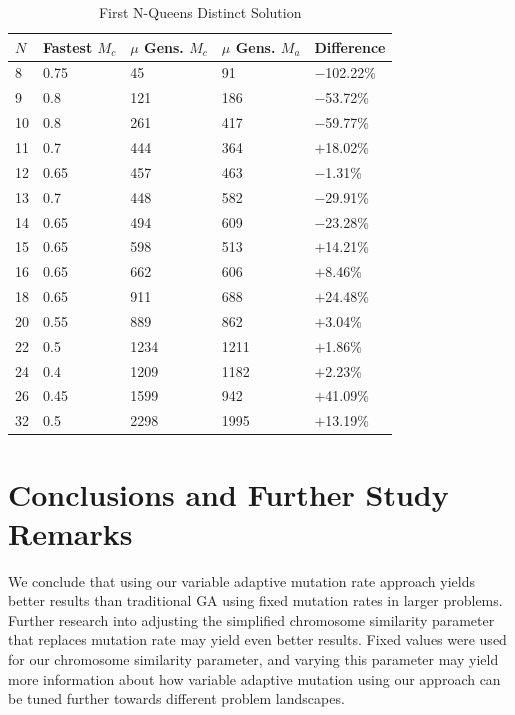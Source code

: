 \documentclass[conference]{IEEEtran}
\begin{document}
\begin{table}
\centering
\caption{First N-Queens Distinct Solution}
\begin{tabular}{|l|l|l|l|l|} \hline
$N$&    Fastest $M_{c}$&    $\mu$ Gens. $M_{c}$&    $\mu$ Gens. $M_{a}$&    Difference\\ \hline
 8&     0.75&               45&                     91&                     $-$102.22\%\\ \hline
 9&     0.8&                121&                    186&                    $-$53.72\%\\ \hline
10&     0.8&                261&                    417&                    $-$59.77\%\\ \hline
11&     0.7&                444&                    364&                    $+$18.02\%\\ \hline
12&     0.65&               457&                    463&                    $-$1.31\%\\ \hline
13&     0.7&                448&                    582&                    $-$29.91\%\\ \hline
14&     0.65&               494&                    609&                    $-$23.28\%\\ \hline
15&     0.65&               598&                    513&                    $+$14.21\%\\ \hline
16&     0.65&               662&                    606&                    $+$8.46\%\\ \hline
18&     0.65&               911&                    688&                    $+$24.48\%\\ \hline
20&     0.55&               889&                    862&                    $+$3.04\%\\ \hline
22&     0.5&                1234&                   1211&                   $+$1.86\%\\ \hline
24&     0.4&                1209&                   1182&                   $+$2.23\%\\ \hline
26&     0.45&               1599&                   942&                    $+$41.09\%\\ \hline
32&     0.5&                2298&                   1995&                   $+$13.19\%\\ \hline
\end{tabular}
\label{table:firstsol}
\end{table}




\section{Conclusions and Further Study Remarks}
We conclude that using our variable adaptive mutation rate approach yields better results than traditional GA using fixed mutation rates in larger problems. Further research into adjusting the simplified chromosome similarity parameter that replaces mutation rate may yield even better results. Fixed values were used for our chromosome similarity parameter, and varying this parameter may yield more information about how variable adaptive mutation using our approach can be tuned further towards different problem landscapes.
\end{document}
